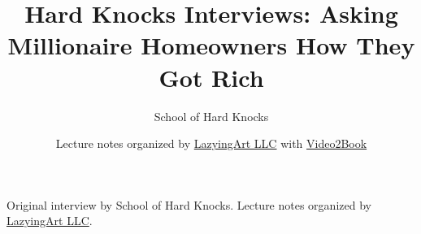 \documentclass[11pt,oneside]{book}
\begin{document}
\frontmatter
\title{Hard Knocks Interviews: Asking Millionaire Homeowners How They Got Rich}
\author{School of Hard Knocks}
\date{Lecture notes organized by \href{https://lazying.art}{LazyingArt LLC} with \href{https://github.com/lachlanchen/Video2Book}{Video2Book}}
\maketitle
\begin{center}
\small Original interview by School of Hard Knocks. Lecture notes organized by \href{https://lazying.art}{LazyingArt LLC}.
\end{center}
\clearpage
\mainmatter

\end{document}
